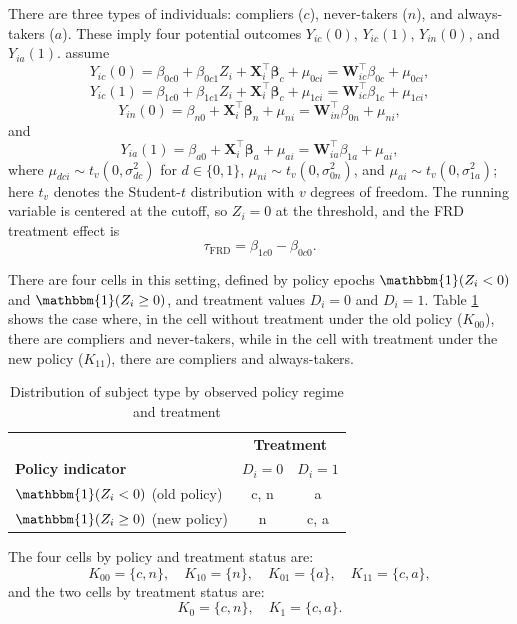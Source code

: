 There are three types of individuals: compliers ($c$), never-takers ($n$), and always-takers ($a$). These imply four potential outcomes $Y_{ic}(0)$, $Y_{ic}(1)$, $Y_{in}(0)$, and $Y_{ia}(1)$. \cite{chib2016bayesian} assume
\[
Y_{ic}(0)=\beta_{0c0}+\beta_{0c1}Z_i+\mathbf{X}_i^{\top}\boldsymbol{\beta}_c+\mu_{0ci}=\mathbf{W}_{ic}^{\top}\beta_{0c}+\mu_{0ci},
\]
\[
Y_{ic}(1)=\beta_{1c0}+\beta_{1c1}Z_i+\mathbf{X}_i^{\top}\boldsymbol{\beta}_c+\mu_{1ci}=\mathbf{W}_{ic}^{\top}\beta_{1c}+\mu_{1ci},
\]
\[
Y_{in}(0)=\beta_{n0}+\mathbf{X}_i^{\top}\boldsymbol{\beta}_n+\mu_{ni}=\mathbf{W}_{in}^{\top}\beta_{0n}+\mu_{ni},
\]
and
\[
Y_{ia}(1)=\beta_{a0}+\mathbf{X}_i^{\top}\boldsymbol{\beta}_a+\mu_{ai}=\mathbf{W}_{ia}^{\top}\beta_{1a}+\mu_{ai},
\]
where $\mu_{dci}\sim t_v(0,\sigma^2_{dc})$ for $d\in\{0,1\}$, $\mu_{ni}\sim t_v(0,\sigma^2_{0n})$, and $\mu_{ai}\sim t_v(0,\sigma^2_{1a})$; here $t_v$ denotes the Student-$t$ distribution with $v$ degrees of freedom. The running variable is centered at the cutoff, so $Z_i=0$ at the threshold, and the FRD treatment effect is
\[
\tau_{\text{FRD}}=\beta_{1c0}-\beta_{0c0}.
\]

There are four cells in this setting, defined by policy epochs $\mathbbm{1}(Z_i < 0)$ and $\mathbbm{1}(Z_i \geq 0)$, and treatment values $D_i = 0$ and $D_i = 1$. Table \ref{tab:appCJ} shows the case where, in the cell without treatment under the old policy ($K_{00}$), there are compliers and never-takers, while in the cell with treatment under the new policy ($K_{11}$), there are compliers and always-takers.

\begin{table}[ht]
	\centering
	\caption{Distribution of subject type by observed policy regime and treatment}\label{tab:appCJ}
	\begin{tabular}{lcc}
		\hline
		& \multicolumn{2}{c}{\textbf{Treatment}} \\ 
		\cline{2-3}
		\textbf{Policy indicator} & $D_i = 0$ & $D_i = 1$ \\ 
		\hline
		$\mathbbm{1}(Z_i < 0)$ (old policy) & c, n & a \\
		$\mathbbm{1}(Z_i \geq 0)$ (new policy) & n & c, a \\
		\hline
	\end{tabular}
\end{table}

The four cells by policy and treatment status are:
\[
K_{00} = \{c, n\}, \quad K_{10} = \{n\}, \quad K_{01} = \{a\}, \quad K_{11} = \{c, a\},
\]
and the two cells by treatment status are:
\[
K_0 = \{c, n\}, \quad K_1 = \{c, a\}.
\]

